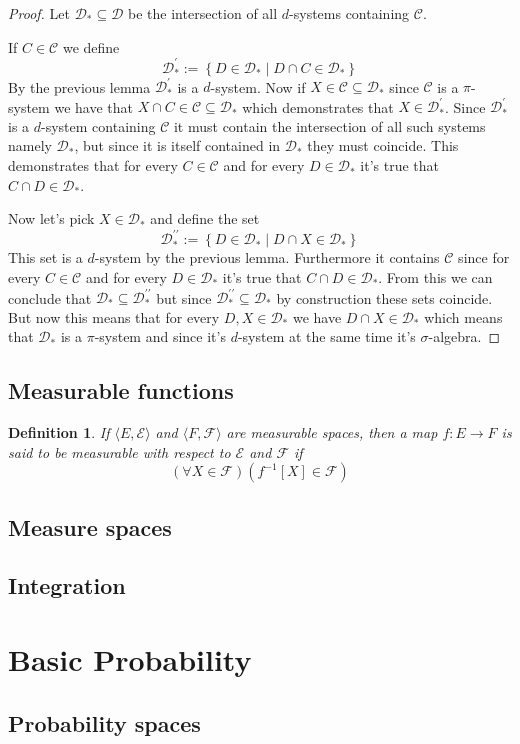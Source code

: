\documentclass[a4paper]{amsart}
\newtheorem{deff}{Definition}
\newcommand{\pair}[2]{\langle #1, #2\rangle}
\begin{document}
\begin{proof}
    Let $\mathcal{D}_* \subseteq \mathcal{D}$ be the intersection of all $d$-systems containing  $\mathcal{C}$.
    
    If $C \in \mathcal{C}$ we define 
    $$ \mathcal{D}_*^\prime := \left\{ D \in \mathcal{D}_* \mid D \cap C \in \mathcal{D}_* \right\}$$
    By the previous lemma $\mathcal{D}_*^\prime$ is a $d$-system.
    Now if $X \in \mathcal{C}  \subseteq \mathcal{D}_* $ 
    since $\mathcal{C}$ is a $\pi$-system we have that 
    $X \cap C \in \mathcal{C} \subseteq \mathcal{D}_*$ which demonstrates that $X \in  \mathcal{D}_*^\prime$. 
    Since $\mathcal{D}_*^\prime$ is a $d$-system containing 
    $\mathcal{C}$ it must contain the intersection of all such 
    systems namely $\mathcal{D}_*$, but since it is itself 
    contained in $\mathcal{D}_*$ they must coincide. This 
    demonstrates that for every $C \in \mathcal{C}$ and for 
    every $D \in \mathcal{D}_*$ it's true that $C \cap D \in \mathcal{D}_*$.
    
    Now let's pick $X \in \mathcal{D}_*$ and define the set
    $$
    \mathcal{D}_*^{\prime\prime} := \left\{ D \in \mathcal{D}_* \mid D \cap X \in \mathcal{D}_* \right\}
    $$
    This set is a $d$-system by the previous lemma.
    Furthermore it contains $\mathcal{C}$ since for every $C \in \mathcal{C}$ and for 
    every $D \in \mathcal{D}_*$ it's true that $C \cap D \in \mathcal{D}_*$. From this we can conclude that 
    $\mathcal{D}_* \subseteq \mathcal{D}_*^{\prime\prime}$ but since $\mathcal{D}_*^{\prime\prime} \subseteq \mathcal{D}_*$ 
    by construction these sets coincide. But now this means 
    that for every $D, X \in \mathcal{D}_*$ we have $D \cap X \in \mathcal{D}_*$ which means that $\mathcal{D}_*$ is
    a $\pi$-system and since it's $d$-system at the same time
    it's $\sigma$-algebra.
\end{proof}




\subsection{Measurable functions}


\begin{deff}
If $\pair{E}{\mathcal{E}}$ and $\pair{F}{\mathcal{F}}$ are 
measurable spaces, then a map $f : E \longrightarrow F$ is 
said to be measurable with respect to $\mathcal{E}$ and $\mathcal{F}$ if 
$$
\left(\forall X \in \mathcal{F}\right) \left( f^{-1}[X] \in \mathcal{F} \right)
$$
\end{deff}

\subsection{Measure spaces}

\subsection{Integration}

\section{Basic Probability}

\subsection{Probability spaces}
\end{document}
